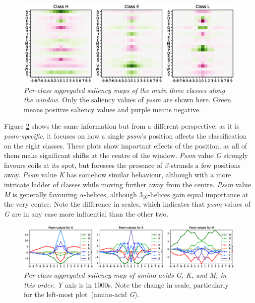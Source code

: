 \begin{figure}
	\centering
	\includegraphics[width=1\linewidth]{Figures/class_agg_class}
	\caption{\textit{Per-class aggregated saliency maps of the main three classes along the window.} Only the saliency values of \textit{pssm} are shown here. Green means positive saliency values and purple means negative.}
	\label{fig:class_agg_class}
\end{figure}

Figure \ref{fig:class_agg_aa} shows the same information but from a different perspective: as it is \textit{pssm-specific}, it focuses on how a single \textit{pssm}'s position affects the classification on the eight classes. These plots show important effects of the position, as all of them make significant shifts at the centre of the window. \textit{Pssm} value \textit{G} strongly favours coils at its spot, but foresees the presence of $\beta$-strands a few positions away. \textit{Pssm} value \textit{K} has somehow similar behaviour, although with a more intricate ladder of classes while moving further away from the centre. \textit{Pssm} value \textit{M} is generally favouring $\alpha$-helices, although $3_{10}$-helices gain equal importance at the very centre. Note the difference in scales, which indicates that \textit{pssm}-values of \textit{G} are in any case more influential than the other two.

\begin{figure}
	\centering
	\includegraphics[width=1\linewidth]{Figures/class_agg_aa}
	\caption{\textit{Per-class aggregated saliency map of amino-acids G, K, and M, in this order.} \textit{Y} axis is in 1000s. Note the change in scale, particularly for the left-most plot~(amino-acid \textit{G}).}
	\label{fig:class_agg_aa}
\end{figure}

